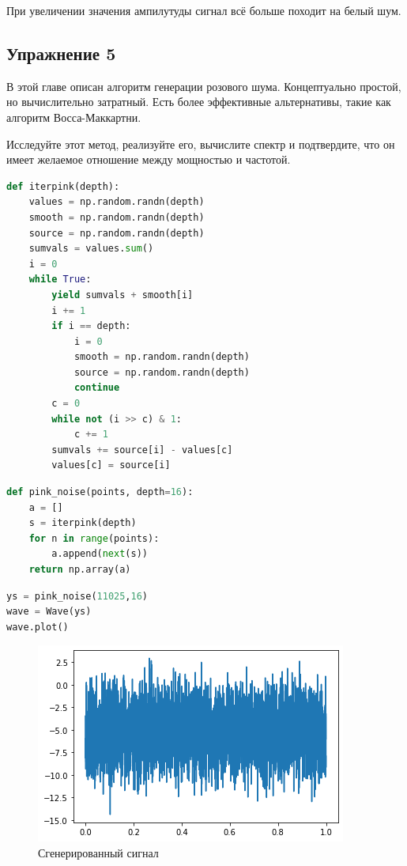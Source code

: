 При увеличении значения ампилутуды сигнал всё больше походит на белый шум.
\subsection{Упражнение 5}

В этой главе описан алгоритм генерации розового шума. Концептуально простой, но вычислительно затратный. Есть более эффективные альтернативы, такие как алгоритм Восса-Маккартни.

\noindent Исследуйте этот метод, реализуйте его, вычислите спектр и подтвердите, что он имеет желаемое отношение между мощностью и частотой.

\begin{lstlisting}[language=Python]
def iterpink(depth):
    values = np.random.randn(depth)
    smooth = np.random.randn(depth)
    source = np.random.randn(depth)
    sumvals = values.sum()
    i = 0
    while True:
        yield sumvals + smooth[i]
        i += 1
        if i == depth:
            i = 0
            smooth = np.random.randn(depth)
            source = np.random.randn(depth)
            continue
        c = 0
        while not (i >> c) & 1:
            c += 1
        sumvals += source[i] - values[c]
        values[c] = source[i]
\end{lstlisting}

\begin{lstlisting}[language=Python]
def pink_noise(points, depth=16):
    a = []
    s = iterpink(depth)
    for n in range(points):
        a.append(next(s))
    return np.array(a)
\end{lstlisting}

\begin{lstlisting}[language=Python]
ys = pink_noise(11025,16)
wave = Wave(ys)
wave.plot()
\end{lstlisting}
\begin{figure}[H]
	\begin{center}
		\includegraphics[scale=1]{fig/lab04/lab04_47_0.png}
		\caption{Сгенерированный сигнал}
	\end{center}
\end{figure}

